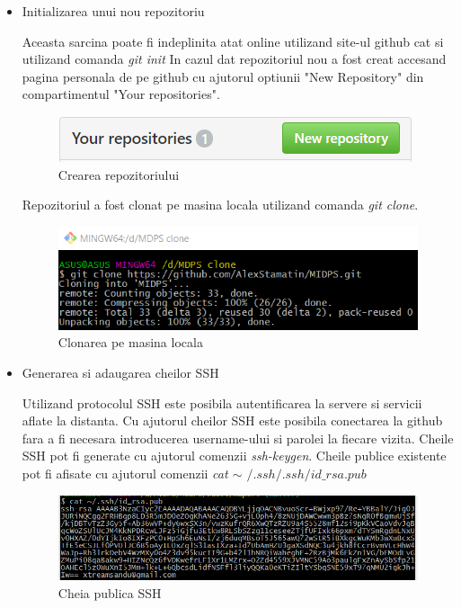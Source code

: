 \begin{itemize}
	\item Initializarea unui nou repozitoriu
		
		Aceasta sarcina poate fi indeplinita atat online utilizand site-ul github cat si utilizand comanda \textit{git init}
		In cazul dat repozitoriul nou a fost creat accesand pagina personala de pe github cu ajutorul optiunii "New Repository" din compartimentul "Your repositories".
		
		\begin{figure}[h]
			\centering
 			 \includegraphics[scale=0.75]{"task 1 create repo"}
 			 \caption{Crearea repozitoriului}
 			 \label{fig:create_repo}
		\end{figure}
\newpage
Repozitoriul a fost clonat pe masina locala utilizand comanda \textit{git clone}.

		\begin{figure}[h!]
			\centering
 			 \includegraphics[scale=0.75]{"task 1 cloning"}
 			 \caption{Clonarea pe masina locala}
 			 \label{fig:clone_repo}
		\end{figure}
		
\item Generarea si adaugarea cheilor SSH

Utilizand protocolul SSH este posibila autentificarea la servere si servicii aflate la distanta. Cu ajutorul cheilor SSH este posibila conectarea la github fara a fi necesara introducerea username-ului si parolei la fiecare vizita.
Cheile SSH pot fi generate cu ajutorul comenzii \textit{ssh-keygen}. Cheile publice existente pot fi afisate cu ajutorul comenzii \textit{cat $\sim$ $/.ssh/.ssh/id\_rsa.pub$}

	\begin{figure}[h!]
			\centering
 			 \includegraphics[scale=0.75]{"task 2 SSH"}
 			 \caption{Cheia publica SSH}
 			 \label{fig:SSH_key}
		\end{figure}


\end{itemize}
